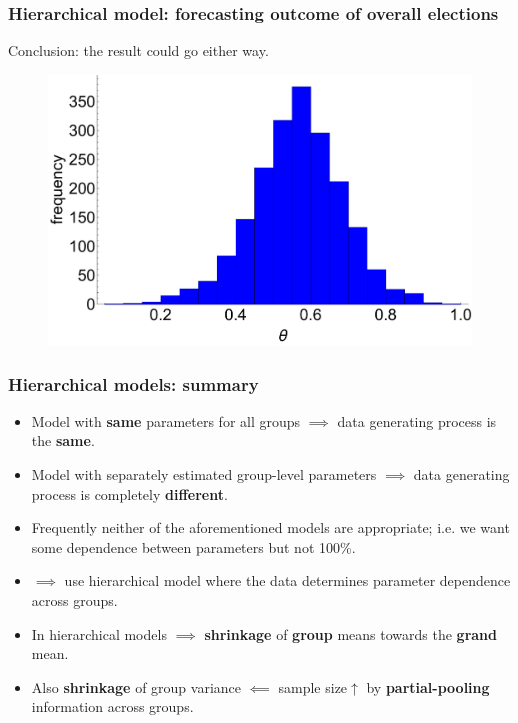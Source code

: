 \documentclass[handout]{beamer}
\begin{document}
\begin{frame}
	\frametitle{Hierarchical model: forecasting outcome of overall elections}
	Conclusion: the result could go either way.
	
	\begin{figure}[ht]
		\centerline{\includegraphics[width=1\textwidth]{figures/lec6_euOverallThetaPost.pdf}}
	\end{figure}
	
\end{frame}

\begin{frame}
	\frametitle{Hierarchical models: summary}
	\begin{itemize}
		\item<2-> Model with \textbf{same} parameters for all groups $\implies$ data generating process is the \textbf{same}.
		\item<3-> Model with separately estimated group-level parameters $\implies$ data generating process is completely \textbf{different}.
		\item<4-> Frequently neither of the aforementioned models are appropriate; i.e. we want some dependence between parameters but not 100\%.
		\item<5-> $\implies$ use hierarchical model where the data determines parameter dependence across groups.
		\item<6-> In hierarchical models $\implies$ \textbf{shrinkage} of \textbf{group} means towards the \textbf{grand} mean.
		\item<7-> Also \textbf{shrinkage }of group variance $\impliedby$ sample size$\uparrow$ by \textbf{partial-pooling} information across groups.
	\end{itemize}
\end{frame}
\end{document}
